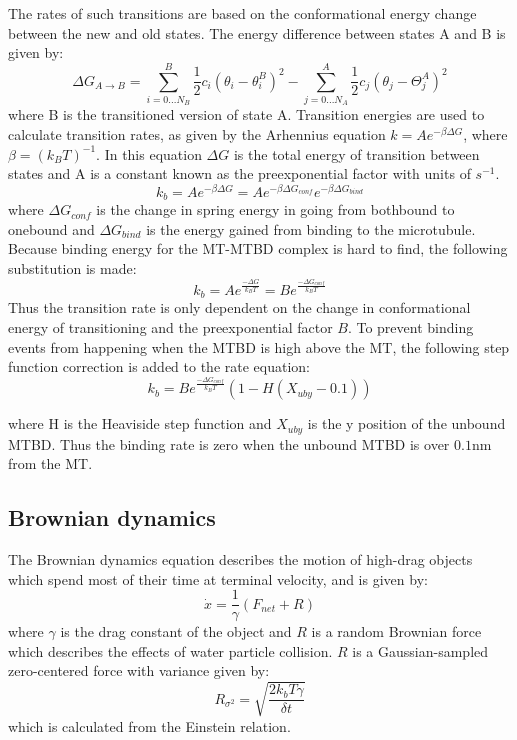 \documentclass[
11pt, %
english, %
singlespacing, %
headsepline, %
chapterinoneline, %
]{MastersDoctoralThesis} %
\begin{document}
The rates of such transitions are based on the conformational energy change between the new and old states. The energy difference between states A and B is given by:
%
\begin{equation}
  \Delta G_{A\rightarrow B} = \sum_{i=0...N_B}^{B} \frac{1}{2}c_i\left(\theta_i-\theta_i^B\right)^2 - \sum_{j=0...N_A}^{A} \frac{1}{2}c_j\left(\theta_j-\Theta_j^A\right)^2
\end{equation}
%
where B is the transitioned version of state A. Transition energies are used to calculate transition rates, as given by the Arhennius equation $k=Ae^{-\beta\Delta G}$, where $\beta = (k_BT)^{-1}$. In this equation $\Delta G$ is the total energy of transition between states and A is a constant known as the preexponential factor with units of $s^{-1}$.\\
%
\begin{equation}
  k_b = Ae^{-\beta\Delta G} = Ae^{-\beta\Delta G_{conf}}e^{-\beta\Delta G_{bind}}
\end{equation}
%
where $\Delta G_{conf}$ is the change in spring energy in going from bothbound to onebound and $\Delta G_{bind}$ is the energy gained from binding to the microtubule. Because binding energy for the MT-MTBD complex is hard to find, the following substitution is made:
%
\begin{equation}
  k_b = Ae^{\frac{-\Delta G}{k_BT}} = Be^{\frac{-\Delta G_{conf}}{k_BT}}
\end{equation}
%
Thus the transition rate is only dependent on the change in conformational energy of transitioning and the preexponential factor $B$. To prevent binding events from happening when the MTBD is high above the MT, the following step function correction is added to the rate equation: \\

\begin{equation}
  k_b = Be^{\frac{-\Delta G_{conf}}{k_BT}}\left(1-H\left(X_{uby}-0.1\right)\right)
\end{equation}

where H is the Heaviside step function and $X_{uby}$ is the y position of the unbound MTBD. Thus the binding rate is zero when the unbound MTBD is over $0.1$nm from the MT.\\

\subsection{Brownian dynamics}
\label{sec:bd}
The Brownian dynamics equation describes the motion of high-drag objects which spend most of their time at terminal velocity, and is given by:
%
\begin{equation}
  \dot{x} = \frac{1}{\gamma}\left(F_{net} + R\right)
\end{equation}
%
where $\gamma$ is the drag constant of the object and $R$ is a random Brownian force which describes the effects of water particle collision. $R$ is a Gaussian-sampled zero-centered force with variance given by:
%
\begin{equation}
  R_{\sigma^2} = \sqrt{\frac{2k_bT\gamma}{\delta t}}
\end{equation}
%
which is calculated from the Einstein relation.\\
\end{document}
